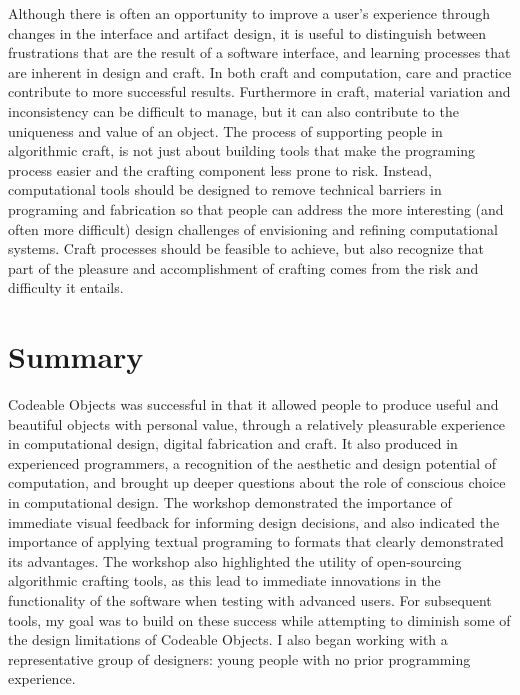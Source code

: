 Although there is often an opportunity to improve a user's experience through changes in the interface and artifact design, it is useful to distinguish between frustrations that are the result of a software interface, and learning processes that are inherent in design and craft. In both craft and computation, care and practice contribute to more successful results. Furthermore in craft, material variation and inconsistency can be difficult to manage, but it can also contribute to the uniqueness and value of an object. The process of supporting people in algorithmic craft, is not just about building tools that make the programing process easier and the crafting component less prone to risk. Instead, computational tools should be designed to remove technical barriers in programing and fabrication so that people can address the more interesting (and often more difficult) design challenges of envisioning and refining computational systems. Craft processes should be feasible to achieve, but also recognize that part of the pleasure and accomplishment of crafting comes from the risk and difficulty it entails. 

\section{Summary}
Codeable Objects was successful in that it allowed people to produce useful and beautiful objects with personal value, through a relatively pleasurable experience in computational design, digital fabrication and craft. It also produced in experienced programmers, a recognition of the aesthetic and design potential of computation, and brought up deeper questions about the role of conscious choice in computational design. The workshop demonstrated the importance of immediate visual feedback for informing design decisions, and also indicated the importance of applying textual programing to formats that clearly demonstrated its advantages. The workshop also highlighted the utility of open-sourcing algorithmic crafting tools, as this lead to immediate innovations in the functionality of the software when testing with advanced users. For subsequent tools, my goal was to build on these success while attempting to diminish some of the design limitations of Codeable Objects. I also began working with a representative group of designers: young people with no prior programming experience. 